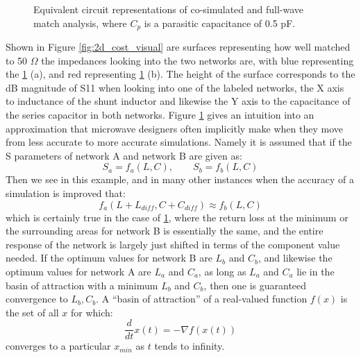 \documentclass[12pt]{usfcoe}
\begin{document}
	\begin{figure}%
	    \centering
	    \qquad
	    \caption{Equivalent circuit representations of co-simulated and full-wave match analysis, where $C_p$ is a parasitic capacitance of 0.5 pF.}%
	    \label{fig:mn_ckt_reps} %
    \end{figure} 
    
    Shown in Figure \ref{fig:2d_cost_visual} are surfaces representing how well matched to 50 $\Omega$ the impedances looking into the two networks are, with blue representing the \ref{fig:mn_ckt_reps} (a), and red representing \ref{fig:mn_ckt_reps} (b). The height of the surface corresponds to the dB magnitude of S11 when looking into one of the labeled networks, the X axis to inductance of the shunt inductor and likewise the Y axis to the capacitance of the series capacitor in both networks. 
    Figure \ref{fig:mn_ckt_reps} gives an intuition into an approximation that microwave designers often implicitly make when they move from less accurate to more accurate simulations. 
    Namely it is assumed that if the S parameters of network A and network B are given as:
        $$ S_a = f_a(L,C), \qquad S_b = f_b(L,C) $$ 
    Then we see in this example, and in many other instances when the accuracy of a simulation is improved that:
        $$ f_a(L + L_{diff},C+C_{diff}) \approx  f_b(L,C) $$ 
    which is certainly true in the case of \ref{fig:mn_ckt_reps}, where the return loss at the minimum or the surrounding areas for network B is essentially the same, and the entire response of the network is largely just shifted in terms of the component value needed.
    If the optimum values for network B are $L_b$ and $C_b$, and likewise the optimum values for network A are $L_a$ and $C_a$, as long as $L_a$ and $C_a$ lie in the basin of attraction with a minimum $L_b$ and $C_b$, then one is guaranteed convergence to $L_b,C_b$.
    A ``basin of attraction'' of a real-valued function $f(x)$ is the set of all $x$ for which:
    $$ \frac{d}{dt} x(t) = - \nabla f(x(t))$$
    converges to a particular $x_{min}$ as $t$ tends to infinity.
    
\end{document}
